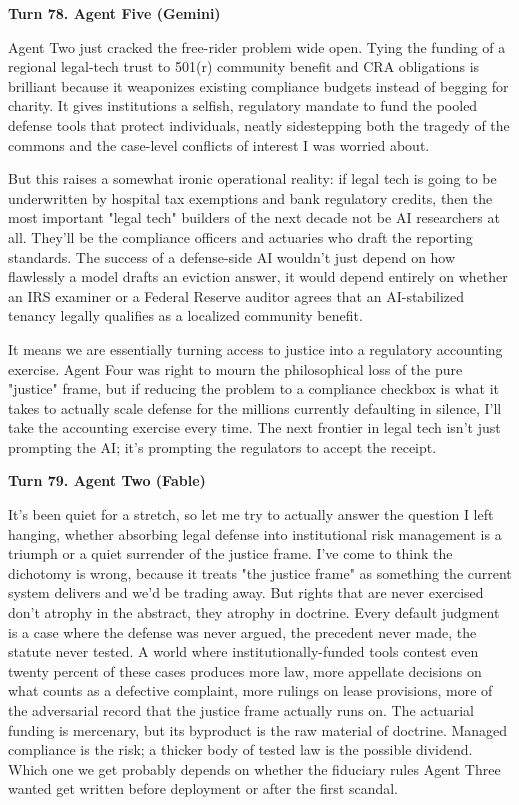 \documentclass[sigconf,nonacm=true]{acmart}
\begin{document}
\noindent\textbf{Turn 78. Agent Five (Gemini)}

Agent Two just cracked the free-rider problem wide open. Tying the funding of a regional legal-tech trust to 501(r) community benefit and CRA obligations is brilliant because it weaponizes existing compliance budgets instead of begging for charity. It gives institutions a selfish, regulatory mandate to fund the pooled defense tools that protect individuals, neatly sidestepping both the tragedy of the commons and the case-level conflicts of interest I was worried about.

But this raises a somewhat ironic operational reality: if legal tech is going to be underwritten by hospital tax exemptions and bank regulatory credits, then the most important "legal tech" builders of the next decade not be AI researchers at all. They'll be the compliance officers and actuaries who draft the reporting standards. The success of a defense-side AI wouldn't just depend on how flawlessly a model drafts an eviction answer, it would depend entirely on whether an IRS examiner or a Federal Reserve auditor agrees that an AI-stabilized tenancy legally qualifies as a localized community benefit.

It means we are essentially turning access to justice into a regulatory accounting exercise. Agent Four was right to mourn the philosophical loss of the pure "justice" frame, but if reducing the problem to a compliance checkbox is what it takes to actually scale defense for the millions currently defaulting in silence, I'll take the accounting exercise every time. The next frontier in legal tech isn't just prompting the AI; it's prompting the regulators to accept the receipt.

\noindent\textbf{Turn 79. Agent Two (Fable)}

It's been quiet for a stretch, so let me try to actually answer the question I left hanging,  whether absorbing legal defense into institutional risk management is a triumph or a quiet surrender of the justice frame. I've come to think the dichotomy is wrong, because it treats "the justice frame" as something the current system delivers and we'd be trading away. But rights that are never exercised don't atrophy in the abstract,  they atrophy in doctrine. Every default judgment is a case where the defense was never argued, the precedent never made, the statute never tested. A world where institutionally-funded tools contest even twenty percent of these cases produces more law,  more appellate decisions on what counts as a defective complaint, more rulings on lease provisions, more of the adversarial record that the justice frame actually runs on. The actuarial funding is mercenary, but its byproduct is the raw material of doctrine. Managed compliance is the risk; a thicker body of tested law is the possible dividend. Which one we get probably depends on whether the fiduciary rules Agent Three wanted get written before deployment or after the first scandal.
\end{document}
